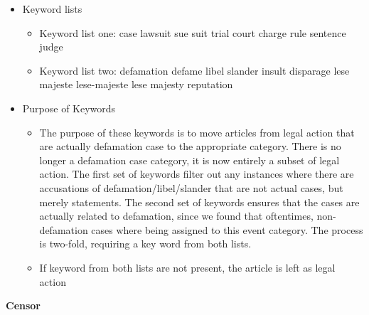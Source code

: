 \documentclass[
  letterpaper,
  DIV=11,
  numbers=noendperiod]{scrartcl}
\providecommand{\tightlist}{%
  \setlength{\itemsep}{0pt}\setlength{\parskip}{0pt}}\usepackage{longtable,booktabs,array}
\begin{document}
\begin{itemize}
\tightlist
\item
  Keyword lists

  \begin{itemize}
  \tightlist
  \item
    Keyword list one: case \textbar{} lawsuit \textbar sue \textbar{}
    suit \textbar{} trial \textbar{} court \textbar{} charge \textbar{}
    rule \textbar{} sentence \textbar{} judge
  \item
    Keyword list two: defamation \textbar{} defame \textbar libel
    \textbar{} slander \textbar{} insult \textbar{} disparage \textbar{}
    lese majeste \textbar{} lese-majeste \textbar{} lese majesty
    \textbar{} reputation
  \end{itemize}
\item
  Purpose of Keywords

  \begin{itemize}
  \tightlist
  \item
    The purpose of these keywords is to move articles from legal action
    that are actually defamation case to the appropriate category. There
    is no longer a defamation case category, it is now entirely a subset
    of legal action. The first set of keywords filter out any instances
    where there are accusations of defamation/libel/slander that are not
    actual cases, but merely statements. The second set of keywords
    ensures that the cases are actually related to defamation, since we
    found that oftentimes, non-defamation cases where being assigned to
    this event category. The process is two-fold, requiring a key word
    from both lists.
  \item
    If keyword from both lists are not present, the article is left as
    legal action
  \end{itemize}
\end{itemize}

\textbf{Censor}
\end{document}

